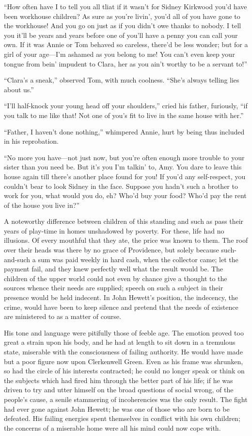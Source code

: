 ``How often have I to tell you all tliat if it wasn't for Sidney
Kirkwood you'd have been workhouse children? As sure as you're livin',
you'd all of you have gone to the workhouse! And you go on just as if
you didn't owe thanks to nobody. I tell you it'll be years and years
before one of you'll have a penny you can call your own. If it was Annie
or Tom behaved so careless, there'd be less wonder; but for a girl of
your age---I'm ashamed as you belong to me! You can't even keep your
tongue from bein' impudent to Clara, her as you ain't worthy to be a
servant to!''

``Clara's a sneak,'' observed Tom, with much coolness. ``She's always
telling lies about us.''

``I'll half-knock your young head off your shoulders,'' cried his
father, furiously, ``if you talk to me like that! Not one of you's fit
to live in the same house with her.''

``Father, I haven't done nothing,'' whimpered {}Annie, hurt by being
thus included in his reprobation.

``No more you have---not just now, but you're often enough more trouble
to your sister than you need be. But it's you I'm talkin' to, Amy. You
dare to leave this house again till there's another place found for you!
If you'd any self-respect, you couldn't bear to look Sidney in the face.
Suppose you hadn't such a brother to work for you, what would you do,
eh? Who'd buy your food? Who'd pay the rent of the house you live in?''

A noteworthy difference between children of this standing and such as
pass their years of play-time in homes unshadowed by poverty. For these,
life had no illusions. Of every mouthful that they ate, the price was
known to them. The roof over their heads was there by no grace of
Providence, but solely because such-and-such a sum was paid weekly in
hard cash, when the collector came; let the payment fail, and they knew
perfectly well what the result would be. The children of the upper world
could not even by chance give a thought to the sources whence their
needs are {}supplied; speech on such a subject in their presence would
be held indecent. In John Hewett's position, the indecency, the crime,
would have been to keep silence and pretend that the needs of existence
are ministered to as a matter of course.

His tone and language were pitifully those of feeble age. The emotion
proved too great a strain upon his body, and he had at length to sit
down in a tremulous state, miserable with the consciousness of failing
authority. He would have made but a poor figure now upon Clerkenwell
Green. Even as his frame was shrunken, so had the circle of his
interests contracted; he could no longer speak or think on the subjects
which had fired him through the better part of his life; if he was
driven to try and utter himself on the broad questions of social wrong,
of the people's cause, a senile stammering of incoherencies was the only
result. The fight had ever gone against John Hewett; he was one of those
who are born to be defeated. His failing energies spent themselves in
conflict with his own children; the concerns of a miserable home were
all his mind could now cope with.

